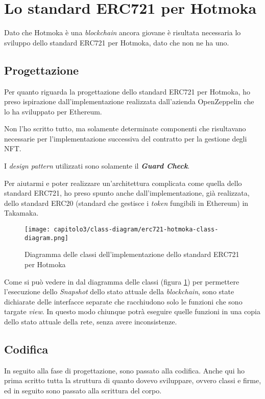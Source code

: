 
\section{Lo standard ERC721 per Hotmoka}
Dato che Hotmoka è una \textit{blockchain} ancora giovane è risultata necessaria lo sviluppo dello standard ERC721 per Hotmoka, dato che non ne ha uno.

\subsection{Progettazione}
Per quanto riguarda la progettazione dello standard ERC721 per Hotmoka, ho preso ispirazione dall'implementazione realizzata dall'azienda OpenZeppelin che lo ha sviluppato per Ethereum.

Non l'ho scritto tutto, ma solamente determinate componenti che risultavano necessarie per l'implementazione successiva del contratto per la gestione degli NFT.

I \textit{design pattern} utilizzati sono solamente il \textbf{\textit{Guard Check}}.

Per aiutarmi e poter realizzare un'architettura complicata come quella dello standard ERC721, ho preso spunto anche dall'implementazione, già realizzata, dello standard ERC20 (standard che gestisce i \textit{token} fungibili in Ethereum) in Takamaka.

\clearpage
\begin{figure}
  \centering
  \texttt{[image: capitolo3/class-diagram/erc721-hotmoka-class-diagram.png]}
  \caption{Diagramma delle classi dell'implementazione dello standard ERC721 per Hotmoka}
  \label{fig:erc721-hotmoka-class-diagram}
\end{figure}

Come si può vedere in dal diagramma delle classi (figura \ref{fig:erc721-hotmoka-class-diagram}) per permettere l'esecuzione dello \textit{Snapshot} dello stato attuale della \textit{blockchain}, sono state dichiarate delle interfacce separate che racchiudono solo le funzioni che sono targate \textit{view}. In questo modo chiunque potrà eseguire quelle funzioni in una copia dello stato attuale della rete, senza avere inconsistenze.

\subsection{Codifica}
In seguito alla fase di progettazione, sono passato alla codifica. Anche qui ho prima scritto tutta la struttura di quanto dovevo sviluppare, ovvero classi e firme, ed in seguito sono passato alla scrittura del corpo. \\

